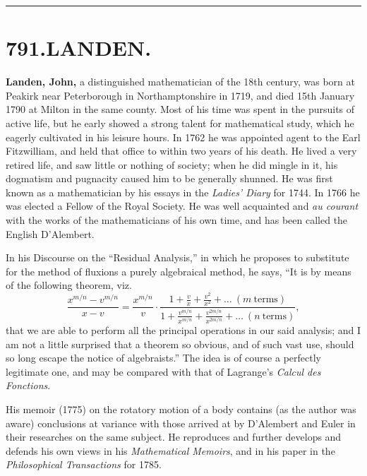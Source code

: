 \documentclass[11pt,a4paper]{book}
\begin{document}
\vspace{1em}
\hrule
\vspace{1em}



\section*{791.\quad LANDEN.}


\smallskip

\textbf{Landen, John,} a distinguished mathematician of the 18th century, was born at Peakirk near Peterborough in Northamptonshire in 1719, and died 15th January 1790 at Milton in the same county. Most of his time was spent in the pursuits of active life, but he early showed a strong talent for mathematical study, which he eagerly cultivated in his leisure hours. In 1762 he was appointed agent to the Earl Fitzwilliam, and held that office to within two years of his death. He lived a very retired life, and saw little or nothing of society; when he did mingle in it, his dogmatism and pugnacity caused him to be generally shunned. He was first known as a mathematician by his essays in the \textit{Ladies' Diary} for 1744. In 1766 he was elected a Fellow of the Royal Society. He was well acquainted and \textit{au courant} with the works of the mathematicians of his own time, and has been called the English D'Alembert.

In his Discourse on the ``Residual Analysis,'' in which he proposes to substitute for the method of fluxions a purely algebraical method, he says, ``It is by means of the following theorem, viz.
\[
\frac{x^{m/n} - v^{m/n}}{x - v} = \frac{x^{m/n}}{v} \cdot \frac{1 + \frac{v}{x} + \frac{v^{2}}{x^{2}} + \ldots\ (m\ \text{terms})}{1 + \frac{v^{m/n}}{x^{m/n}} + \frac{v^{2m/n}}{x^{2m/n}} + \ldots\ (n\ \text{terms})},
\]
that we are able to perform all the principal operations in our said analysis; and I am not a little surprised that a theorem so obvious, and of such vast use, should so long escape the notice of algebraists.'' The idea is of course a perfectly legitimate one, and may be compared with that of Lagrange's \textit{Calcul des Fonctions}.

His memoir (1775) on the rotatory motion of a body contains (as the author was aware) conclusions at variance with those arrived at by D'Alembert and Euler in their researches on the same subject. He reproduces and further develops and defends his own views in his \textit{Mathematical Memoirs}, and in his paper in the \textit{Philosophical Transactions} for 1785.
\end{document}

